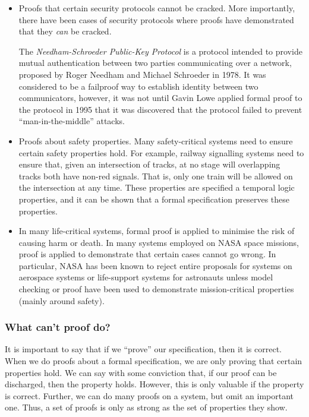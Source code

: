 \begin{itemize}

 \item Proofs that certain security protocols cannot be cracked. More importantly, there have been cases of security protocols where proofs have demonstrated that they \emph{can} be cracked.

 The \emph{Needham-Schroeder Public-Key Protocol} is a protocol intended to provide mutual authentication between two parties communicating over a network, proposed by Roger Needham and Michael Schroeder in 1978. It was considered to be a failproof way to establish identity between two communicators, however, it was not until Gavin Lowe applied formal proof to the protocol in 1995 that it was discovered that the protocol failed to prevent ``man-in-the-middle'' attacks.

 \item Proofs about safety properties. Many safety-critical systems need to ensure certain safety properties hold. For example, railway signalling systems need to ensure that, given an intersection of tracks, at no stage will overlapping tracks both have non-red signals. That is, only one train will be allowed on the intersection at any time. These properties are specified a temporal logic properties, and it can be shown that a formal specification preserves these properties.

 \item In many life-critical systems, formal proof is applied to minimise the risk of causing harm or death. In many systems employed on NASA space missions, proof is applied to demonstrate that certain cases cannot go wrong. In particular, NASA has been known to reject entire proposals for systems on aerospace systems or life-support systems for astronauts unless model checking or proof have been used to demonstrate mission-critical properties (mainly around safety).

\end{itemize}

\subsubsection*{What can't proof do?}

It is important to say that if we ``prove'' our specification, then it is correct. When we do proofs about a formal specification, we are only proving that certain properties hold. We can say with some conviction that, if our proof can be discharged, then the property holds. However, this is only valuable if the property is correct. Further, we can do many proofs on a system, but omit an important one. Thus, a set of proofs is only as strong as the set of properties they show.

